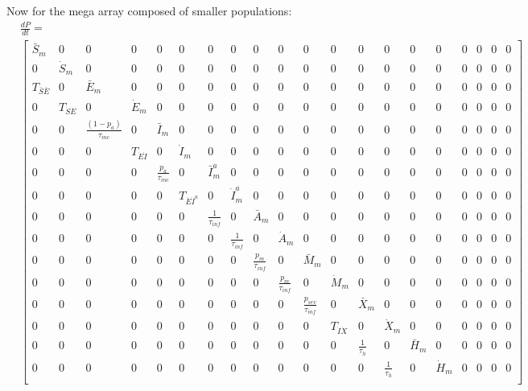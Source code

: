 \documentclass[notitlepage, superscriptaddress]{revtex4-2}
\begin{document}
Now for the mega array composed of smaller populations:
\begin{eqnarray}
&\frac{dP}{dt} = \nonumber \\
&\begin{bmatrix}
\bar{S}_{m} & 0 & 0 & 0 & 0 & 0 & 0 & 0 & 0 & 0 & 0 & 0 & 0 & 0 & 0 & 0 & 0 & 0 & 0 & 0 \\[.1cm] 
0 & \dot{S}_{m} & 0 & 0 & 0 & 0 & 0 & 0 & 0 & 0 & 0 & 0 & 0 & 0 & 0 & 0 & 0 & 0 & 0 & 0 \\[.1cm] 
T_{\bar{S}\bar{E}} & 0 & \bar{E}_{m} & 0 & 0 & 0 & 0 & 0 & 0 & 0 & 0 & 0 & 0 & 0 & 0 & 0 & 0 & 0 & 0 & 0 \\[.1cm] 
0 & T_{\dot{S}\dot{E}} & 0 & \dot{E}_{m} & 0 & 0 & 0 & 0 & 0 & 0 & 0 & 0 & 0 & 0 & 0 & 0 & 0 & 0 & 0 & 0 \\[.1cm] 
0 & 0 & \frac{(1-p_{a})}{\tau_{inc}} & 0 & \bar{I}_{m} & 0 & 0 & 0 & 0 & 0 & 0 & 0 & 0 & 0 & 0 & 0 & 0 & 0 & 0 & 0 \\[.1cm] 
0 & 0 & 0 & T_{\dot{E}\dot{I}} & 0 & \dot{I}_{m} & 0 & 0 & 0 & 0 & 0 & 0 & 0 & 0 & 0 & 0 & 0 & 0 & 0 & 0 \\[.1cm] 
0 & 0 & 0 & 0 & \frac{p_{a}}{\tau_{inc}} & 0 & \bar{I}^{a}_{m} & 0 & 0 & 0 & 0 & 0 & 0 & 0 & 0 & 0 & 0 & 0 & 0 & 0 \\[.1cm] 
0 & 0 & 0 & 0 & 0 & T_{\dot{E}\dot{I}^{a}} & 0 & \dot{I}^{a}_{m} & 0 & 0 & 0 & 0 & 0 & 0 & 0 & 0 & 0 & 0 & 0 & 0 \\[.1cm] 
0 & 0 & 0 & 0 & 0 & 0 & \frac{1}{\tau_{inf}} & 0 & \bar{A}_{m} & 0 & 0 & 0 & 0 & 0 & 0 & 0 & 0 & 0 & 0 & 0 \\[.1cm] 
0 & 0 & 0 & 0 & 0 & 0 & 0 & \frac{1}{\tau_{inf}} & 0 & \dot{A}_{m} & 0 & 0 & 0 & 0 & 0 & 0 & 0 & 0 & 0 & 0 \\[.1cm] 
0 & 0 & 0 & 0 & 0 & 0 & 0 & 0 & \frac{p_{m}}{\tau_{inf}} & 0 & \bar{M}_{m} & 0 & 0 & 0 & 0 & 0 & 0 & 0 & 0 & 0 \\[.1cm] 
0 & 0 & 0 & 0 & 0 & 0 & 0 & 0 & 0 & \frac{p_{m}}{\tau_{inf}} & 0 & \dot{M}_{m} & 0 & 0 & 0 & 0 & 0 & 0 & 0 & 0 \\[.1cm] 
0 & 0 & 0 & 0 & 0 & 0 & 0 & 0 & 0 & 0 & \frac{p_{sev}}{\tau_{inf}} & 0 & \bar{X}_{m} & 0 & 0 & 0 & 0 & 0 & 0 & 0 \\[.1cm] 
0 & 0 & 0 & 0 & 0 & 0 & 0 & 0 & 0 & 0 & 0 & T_{\dot{I}\dot{X}} & 0 & \dot{X}_{m} & 0 & 0 & 0 & 0 & 0 & 0 \\[.1cm] 
0 & 0 & 0 & 0 & 0 & 0 & 0 & 0 & 0 & 0 & 0 & 0 & \frac{1}{\tau_{h}} & 0 & \bar{H}_{m} & 0 & 0 & 0 & 0 & 0 \\[.1cm] 
0 & 0 & 0 & 0 & 0 & 0 & 0 & 0 & 0 & 0 & 0 & 0 & 0 & \frac{1}{\tau_{h}} & 0 & \dot{H}_{m} & 0 & 0 & 0 & 0 \\[.1cm] 

\end{bmatrix}
\end{eqnarray}
\end{document}
